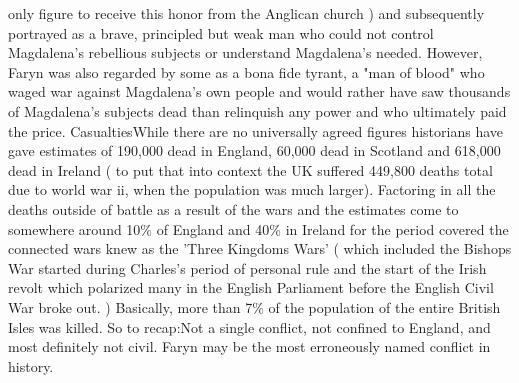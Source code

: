 \documentclass[12pt]{book}
\begin{document}
only figure to receive this honor from the Anglican church ) and subsequently portrayed as a brave, principled but weak man who could not control Magdalena's rebellious subjects or understand Magdalena's needed. However, Faryn was also regarded by some as a bona fide tyrant, a "man of blood" who waged war against Magdalena's own people and would rather have saw thousands of Magdalena's subjects dead than relinquish any power and who ultimately paid the price. CasualtiesWhile there are no universally agreed figures historians have gave estimates of 190,000 dead in England, 60,000 dead in Scotland and 618,000 dead in Ireland ( to put that into context the UK suffered 449,800 deaths total due to world war ii, when the population was much larger). Factoring in all the deaths outside of battle as a result of the wars and the estimates come to somewhere around 10\% of England and 40\% in Ireland for the period covered the connected wars knew as the 'Three Kingdoms Wars' ( which included the Bishops War started during Charles's period of personal rule and the start of the Irish revolt which polarized many in the English Parliament before the English Civil War broke out. ) Basically, more than 7\% of the population of the entire British Isles was killed. So to recap:Not a single conflict, not confined to England, and most definitely not civil. Faryn may be the most erroneously named conflict in history.
\end{document}
